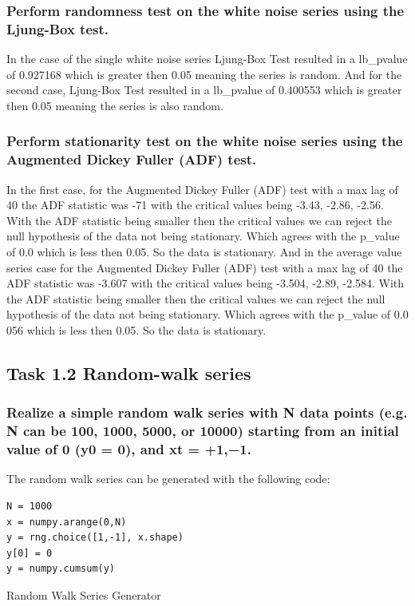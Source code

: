 \documentclass{article}
\begin{document}
\subsubsection{Perform randomness test on the white noise series using the Ljung-Box test.}

In the case of the single white noise series Ljung-Box Test resulted in a lb\_pvalue of 0.927168 which is greater then 0.05 meaning the series is random. And for the second case, Ljung-Box Test resulted in a lb\_pvalue of 0.400553 which is greater then 0.05 meaning the series is also random.

\subsubsection{Perform stationarity test on the white noise series using the Augmented Dickey
Fuller (ADF) test.}
In the first case, for the Augmented Dickey Fuller (ADF) test with a max lag of 40 the ADF statistic was -71 with the critical values being -3.43, -2.86, -2.56. With the ADF statistic being smaller then the critical values we can reject the null hypothesis of the data not being stationary. Which agrees with the p\_value of 0.0 which is less then 0.05. So the data is stationary. And in the average value series case for the Augmented Dickey Fuller (ADF) test with a max lag of 40 the ADF statistic was -3.607 with the critical values being -3.504, -2.89, -2.584. With the ADF statistic being smaller then the critical values we can reject the null hypothesis of the data not being stationary. Which agrees with the p\_value of 0.0 056 which is less then 0.05. So the data is stationary.

\subsection{Task 1.2 Random-walk series}
\subsubsection{Realize a simple random walk series with N data points (e.g. N can be 100, 1000,
 5000, or 10000) starting from an initial value of 0 (y0 = 0), and xt = +1,−1.}
 The random walk series can be generated with the following code:
 
\begin{listing}[!ht]
\begin{verbatim}
N = 1000
x = numpy.arange(0,N)
y = rng.choice([1,-1], x.shape)
y[0] = 0
y = numpy.cumsum(y)
\end{verbatim}
\caption{Random Walk Series Generator}
\label{listing:gen_random}
\end{listing}
\end{document}
